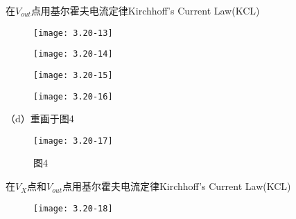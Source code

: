 在$V_{out}$点用基尔霍夫电流定律Kirchhoff’s Current Law(KCL)

		\begin{figure}[H] %
	\begin{minipage}{\linewidth}
		\texttt{[image: 3.20-13]}
	\end{minipage}
\end{figure}

\begin{figure}[H] %
	\begin{minipage}{\linewidth}
		\texttt{[image: 3.20-14]}
	\end{minipage}
\end{figure}

\begin{figure}[H] %
	\begin{minipage}{\linewidth}
		\texttt{[image: 3.20-15]}
	\end{minipage}
\end{figure}

\begin{figure}[H] %
	\begin{minipage}{\linewidth}
		\texttt{[image: 3.20-16]}
	\end{minipage}
\end{figure}















\scalebox{3}{（d）}

（d）重画于图4

		\begin{figure}[H] %
	\begin{minipage}{\linewidth}
		\texttt{[image: 3.20-17]}
	\end{minipage}
	\caption*{图4} %
\end{figure}




在$V_{X}$点和$V_{out}$点用基尔霍夫电流定律Kirchhoff’s Current Law(KCL)

		\begin{figure}[H] %
	\begin{minipage}{\linewidth}
		\texttt{[image: 3.20-18]}
	\end{minipage}
\end{figure}

